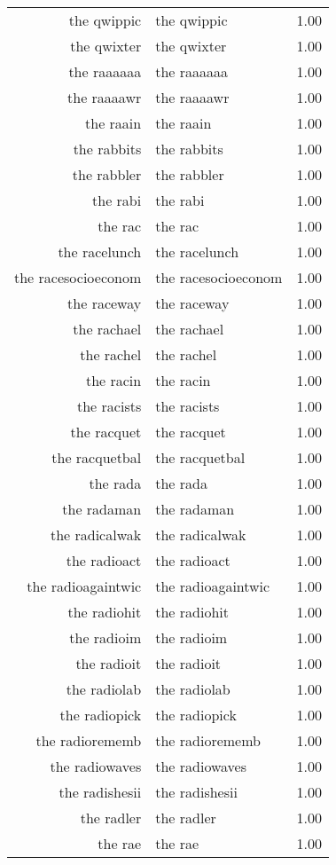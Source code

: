 \begin{table}[ht]
\begin{tabular}{rlr}
  the qwippic & the qwippic & 1.00 \\ 
  the qwixter & the qwixter & 1.00 \\ 
  the raaaaaa & the raaaaaa & 1.00 \\ 
  the raaaawr & the raaaawr & 1.00 \\ 
  the raain & the raain & 1.00 \\ 
  the rabbits & the rabbits & 1.00 \\ 
  the rabbler & the rabbler & 1.00 \\ 
  the rabi & the rabi & 1.00 \\ 
  the rac & the rac & 1.00 \\ 
  the racelunch & the racelunch & 1.00 \\ 
  the racesocioeconom & the racesocioeconom & 1.00 \\ 
  the raceway & the raceway & 1.00 \\ 
  the rachael & the rachael & 1.00 \\ 
  the rachel & the rachel & 1.00 \\ 
  the racin & the racin & 1.00 \\ 
  the racists & the racists & 1.00 \\ 
  the racquet & the racquet & 1.00 \\ 
  the racquetbal & the racquetbal & 1.00 \\ 
  the rada & the rada & 1.00 \\ 
  the radaman & the radaman & 1.00 \\ 
  the radicalwak & the radicalwak & 1.00 \\ 
  the radioact & the radioact & 1.00 \\ 
  the radioagaintwic & the radioagaintwic & 1.00 \\ 
  the radiohit & the radiohit & 1.00 \\ 
  the radioim & the radioim & 1.00 \\ 
  the radioit & the radioit & 1.00 \\ 
  the radiolab & the radiolab & 1.00 \\ 
  the radiopick & the radiopick & 1.00 \\ 
  the radiorememb & the radiorememb & 1.00 \\ 
  the radiowaves & the radiowaves & 1.00 \\ 
  the radishesii & the radishesii & 1.00 \\ 
  the radler & the radler & 1.00 \\ 
  the rae & the rae & 1.00 \\ 

\end{tabular}
\end{table}
